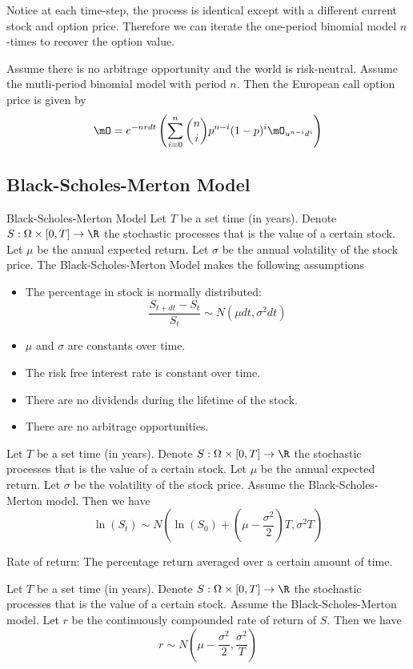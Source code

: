 \documentclass[a4paper]{article}
\begin{document}
Notice at each time-step, the process is identical except with a different current stock and option price. Therefore we can iterate the one-period binomial model $n$-times to recover the option value. 

\begin{prp}{}{} Assume there is no arbitrage opportunity and the world is risk-neutral. Assume the mutli-period binomial model with period $n$. Then the European call option price is given by $$\mO=e^{-nrdt}\left(\sum_{i=0}^n\binom{n}{i}p^{n-i}(1-p)^i\mO_{u^{n-i}d^i}\right)$$
\end{prp}

\subsection{Black-Scholes-Merton Model}
\begin{defn}{Black-Scholes-Merton Model}{} Let $T$ be a set time (in years). Denote $S:\Omega\times[0,T]\to\R$ the stochastic processes that is the value of a certain stock. Let $\mu$ be the annual expected return. Let $\sigma$ be the annual volatility of the stock price. The Black-Scholes-Merton Model makes the following assumptions
\begin{itemize}
\item The percentage in stock is normally distributed: $$\frac{S_{t+dt}-S_t}{S_t}\sim N(\mu dt, \sigma^2dt)$$ 
\item $\mu$ and $\sigma$ are constants over time. 
\item The risk free interest rate is constant over time. 
\item There are no dividends during the lifetime of the stock. 
\item There are no arbitrage opportunities. 
\end{itemize}
\end{defn}

\begin{lmm}{}{} Let $T$ be a set time (in years). Denote $S:\Omega\times[0,T]\to\R$ the stochastic processes that is the value of a certain stock. Let $\mu$ be the annual expected return. Let $\sigma$ be the volatility of the stock price. Assume the Black-Scholes-Merton model. Then we have $$\ln(S_t)\sim N\left(\ln(S_0)+\left(\mu-\frac{\sigma^2}{2}\right)T,\sigma^2T\right)$$
\end{lmm}

Rate of return: The percentage return averaged over a certain amount of time. 

\begin{lmm}{}{} Let $T$ be a set time (in years). Denote $S:\Omega\times[0,T]\to\R$ the stochastic processes that is the value of a certain stock. Assume the Black-Scholes-Merton model. Let $r$ be the continuously compounded rate of return of $S$. Then we have $$r\sim N\left(\mu-\frac{\sigma^2}{2},\frac{\sigma^2}{T}\right)$$
\end{lmm}
\end{document}
